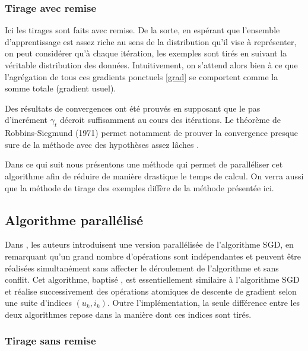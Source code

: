 \documentclass[10pt,a4paper]{article}
\begin{document}
\subsubsection*{Tirage avec remise}

Ici les tirages sont faits avec remise. De la sorte, en espérant que l'ensemble d'apprentissage est assez riche au sens de la distribution qu'il vise à représenter, on peut considérer qu'à chaque itération, les exemples sont tirés en suivant la véritable distribution des données. Intuitivement, on s'attend alors bien à ce que l'agrégation de tous ces gradients ponctuels \eqref{grad} se comportent comme la somme totale (gradient usuel).

Des résultats de convergences ont été prouvés en supposant que le pas d'incrément $\gamma_t$ décroit suffisamment au cours des itérations. Le théorème de Robbins-Siegmund (1971) permet notamment de prouver la convergence presque sure de la méthode avec des hypothèses assez lâches \cite{bottouSGD}.

Dans ce qui suit nous présentons une méthode qui permet de paralléliser cet algorithme afin de réduire de manière drastique le temps de calcul. On verra aussi que la méthode de tirage des exemples diffère de la méthode présentée ici.

\subsection{Algorithme parallélisé \jel }

Dans \cite{jelly}, les auteurs introduisent une version parallélisée de l'algorithme SGD, en remarquant qu'un grand nombre d'opérations sont indépendantes et peuvent être réalisées simultanément sans affecter le déroulement de l'algorithme et sans conflit. Cet algorithme, baptisé \jel, est essentiellement similaire à l'algorithme SGD et réalise successivement des opérations atomiques de descente de gradient selon une suite d'indices $(u_k,i_k)$. Outre l'implémentation, la seule différence entre les deux algorithmes repose dans la manière dont ces indices sont tirés.

\subsubsection*{Tirage sans remise}
\end{document}
